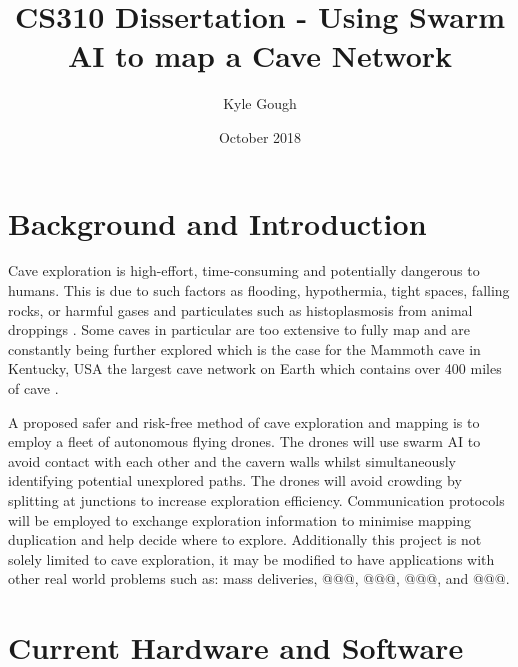 \documentclass{article}
\title{CS310 Dissertation - Using Swarm AI to map a Cave Network}
\author{Kyle Gough}
\date{October 2018}
\begin{document}
\maketitle

\section{Background and Introduction}

Cave exploration is high-effort, time-consuming and potentially dangerous to humans. This is due to such factors as flooding, hypothermia, tight spaces, falling rocks, or harmful gases and particulates such as histoplasmosis from animal droppings \cite{Histoplasmosis}. Some caves in particular are too extensive to fully map and are constantly being further explored which is the case for the Mammoth cave in Kentucky, USA the largest cave network on Earth which contains over 400 miles of cave \cite{Mammoth}.

A proposed safer and risk-free method of cave exploration and mapping is to employ a fleet of autonomous flying drones. The drones will use swarm AI to avoid contact with each other and the cavern walls whilst simultaneously identifying potential unexplored paths. The drones will avoid crowding by splitting at junctions to increase exploration efficiency. Communication protocols will be employed to exchange exploration information to minimise mapping duplication and help decide where to explore. Additionally this project is not solely limited to cave exploration, it may be modified to have applications with other real world problems such as: mass deliveries, @@@, @@@, @@@, and @@@.


\section{Current Hardware and Software}
\end{document}
